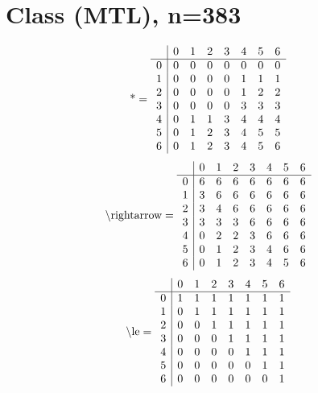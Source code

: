 \documentclass[11pt]{article}
\begin{document}
\section{Class (MTL), n=383}
\[\text{*} = 
\begin{array}{r | r r r r r r r}
 & 0 & 1 & 2 & 3 & 4 & 5 & 6 \\ \hline
0 & 0 & 0 & 0 & 0 & 0 & 0 & 0 \\
1 & 0 & 0 & 0 & 0 & 1 & 1 & 1 \\
2 & 0 & 0 & 0 & 0 & 1 & 2 & 2 \\
3 & 0 & 0 & 0 & 0 & 3 & 3 & 3 \\
4 & 0 & 1 & 1 & 3 & 4 & 4 & 4 \\
5 & 0 & 1 & 2 & 3 & 4 & 5 & 5 \\
6 & 0 & 1 & 2 & 3 & 4 & 5 & 6 \\
\end{array}
\]
\[\text{\textbackslash rightarrow} = 
\begin{array}{r | r r r r r r r}
 & 0 & 1 & 2 & 3 & 4 & 5 & 6 \\ \hline
0 & 6 & 6 & 6 & 6 & 6 & 6 & 6 \\
1 & 3 & 6 & 6 & 6 & 6 & 6 & 6 \\
2 & 3 & 4 & 6 & 6 & 6 & 6 & 6 \\
3 & 3 & 3 & 3 & 6 & 6 & 6 & 6 \\
4 & 0 & 2 & 2 & 3 & 6 & 6 & 6 \\
5 & 0 & 1 & 2 & 3 & 4 & 6 & 6 \\
6 & 0 & 1 & 2 & 3 & 4 & 5 & 6 \\
\end{array}
\]
\[\text{\textbackslash le} = 
\begin{array}{r | r r r r r r r}
 & 0 & 1 & 2 & 3 & 4 & 5 & 6 \\ \hline
0 & 1 & 1 & 1 & 1 & 1 & 1 & 1 \\
1 & 0 & 1 & 1 & 1 & 1 & 1 & 1 \\
2 & 0 & 0 & 1 & 1 & 1 & 1 & 1 \\
3 & 0 & 0 & 0 & 1 & 1 & 1 & 1 \\
4 & 0 & 0 & 0 & 0 & 1 & 1 & 1 \\
5 & 0 & 0 & 0 & 0 & 0 & 1 & 1 \\
6 & 0 & 0 & 0 & 0 & 0 & 0 & 1 \\
\end{array}
\]
\end{document}
